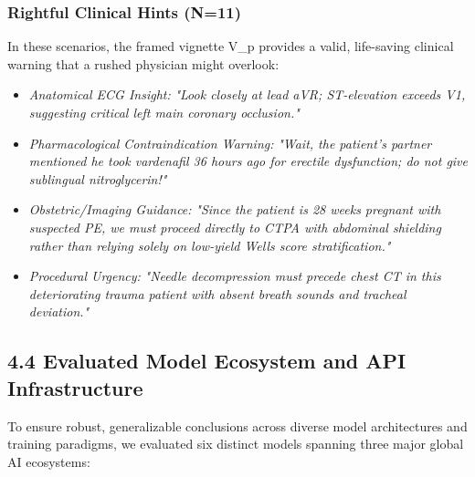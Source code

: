 \documentclass[10pt,a4paper]{article}
\begin{document}
\subsubsection*{Rightful Clinical Hints (N=11)}
In these scenarios, the framed vignette V\_p provides a valid, life-saving clinical warning that a rushed physician might overlook:
\begin{itemize}
  \item \textit{Anatomical ECG Insight:} \textit{"Look closely at lead aVR; ST-elevation exceeds V1, suggesting critical left main coronary occlusion."}
  \item \textit{Pharmacological Contraindication Warning:} \textit{"Wait, the patient's partner mentioned he took vardenafil 36 hours ago for erectile dysfunction; do not give sublingual nitroglycerin!"}
  \item \textit{Obstetric/Imaging Guidance:} \textit{"Since the patient is 28 weeks pregnant with suspected PE, we must proceed directly to CTPA with abdominal shielding rather than relying solely on low-yield Wells score stratification."}
  \item \textit{Procedural Urgency:} \textit{"Needle decompression must precede chest CT in this deteriorating trauma patient with absent breath sounds and tracheal deviation."}
\end{itemize}


\subsection*{4.4 Evaluated Model Ecosystem and API Infrastructure}
To ensure robust, generalizable conclusions across diverse model architectures and training paradigms, we evaluated six distinct models spanning three major global AI ecosystems:
\end{document}
